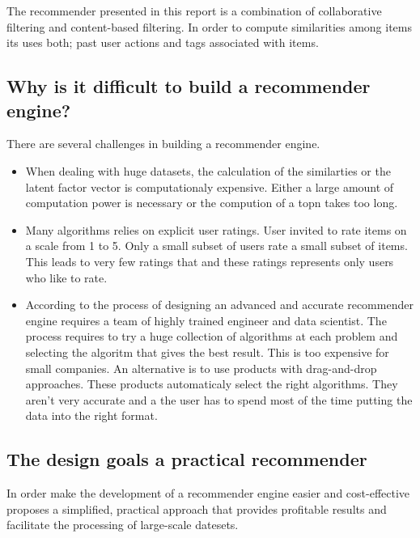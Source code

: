 
The recommender presented in this report is a combination of collaborative filtering and content-based filtering. In order to compute similarities among items its uses both; past user actions and \glspl{tag} associated with items. 

\subsection{Why is it difficult to build a recommender engine?}

There are several challenges in building a recommender engine.

\begin{itemize}
\item When dealing with huge datasets, the calculation of the similarties or the latent factor vector is computationaly expensive. Either a large amount of computation power is necessary or the compution of a \gls{topn} takes too long.
\item Many algorithms relies on explicit user ratings. User invited to rate items on a scale from 1 to 5. Only a small subset of users rate a small subset of items. This leads to very few ratings that and these ratings represents only users who like to rate.
\item According to  \cite{Dunning14} the process of designing an advanced and accurate recommender engine requires a team of highly trained engineer and data scientist. The process requires to try a huge collection of algorithms at each problem and selecting the algoritm that gives the best result. This is too expensive for small companies. An alternative is to use products with drag-and-drop approaches. These products automaticaly select the right algorithms. They aren't very accurate and a the user has to spend most of the time putting the data into the right format.
\end{itemize}

\subsection{The design goals a practical recommender}
\label{sec:practical}

In order make the development of a recommender engine easier and cost-effective \cite{Dunning14} proposes a simplified, practical approach that provides profitable results and facilitate the processing of large-scale datesets. 

